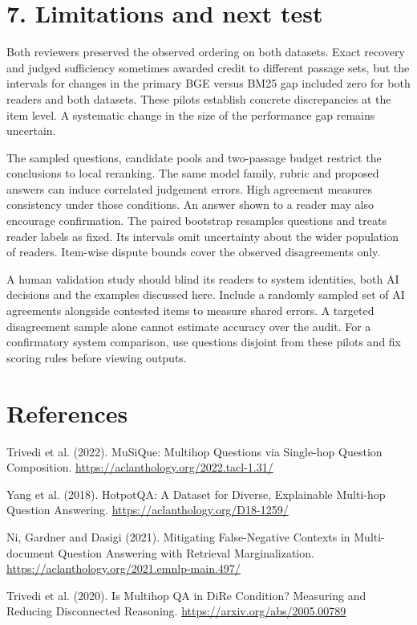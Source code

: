 \documentclass[11pt]{article}
\begin{document}
\section*{7. Limitations and next test}
Both reviewers preserved the observed ordering on both datasets. Exact recovery and judged sufficiency sometimes awarded credit to different passage sets, but the intervals for changes in the primary BGE versus BM25 gap included zero for both readers and both datasets. These pilots establish concrete discrepancies at the item level. A systematic change in the size of the performance gap remains uncertain.

The sampled questions, candidate pools and two-passage budget restrict the conclusions to local reranking. The same model family, rubric and proposed answers can induce correlated judgement errors. High agreement measures consistency under those conditions. An answer shown to a reader may also encourage confirmation. The paired bootstrap resamples questions and treats reader labels as fixed. Its intervals omit uncertainty about the wider population of readers. Item-wise dispute bounds cover the observed disagreements only.

A human validation study should blind its readers to system identities, both AI decisions and the examples discussed here. Include a randomly sampled set of AI agreements alongside contested items to measure shared errors. A targeted disagreement sample alone cannot estimate accuracy over the audit. For a confirmatory system comparison, use questions disjoint from these pilots and fix scoring rules before viewing outputs.

\section*{References}
Trivedi et al. (2022). MuSiQue: Multihop Questions via Single-hop Question Composition. \url{https://aclanthology.org/2022.tacl-1.31/}

Yang et al. (2018). HotpotQA: A Dataset for Diverse, Explainable Multi-hop Question Answering. \url{https://aclanthology.org/D18-1259/}

Ni, Gardner and Dasigi (2021). Mitigating False-Negative Contexts in Multi-document Question Answering with Retrieval Marginalization. \url{https://aclanthology.org/2021.emnlp-main.497/}

Trivedi et al. (2020). Is Multihop QA in DiRe Condition? Measuring and Reducing Disconnected Reasoning. \url{https://arxiv.org/abs/2005.00789}
\end{document}
